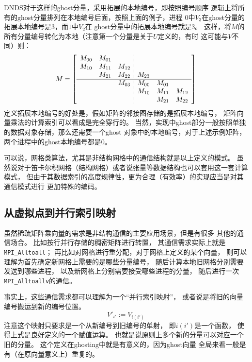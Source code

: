 \documentclass[UTF8,zihao=5]{ctexart} %
\begin{document}
DNDS对于这样的ghost分量，采用拓展的本地编号，即按照编号顺序
逻辑上将所有的ghost分量排列在本地编号后面，按照上面的例子，进程
$0$中$V_3$在ghost分量的拓展本地编号是$3$，而$1$中$V_2$在
ghost分量中的拓展本地编号就是$3$。
这样，将$M$的所有分量编号转化为本地（注意第一个分量是关于$U$定义的，有时
这可能与$V$不同）则：
$$
    M=
    \left[
        \begin{array}{ccc:ccc}
            M_{00} & M_{01} &        &        &        &        \\
            M_{10} & M_{11} & M_{12} &        &        &        \\
                   & M_{21} & M_{22} & M_{23} &        &        \\
            \hline
                   &        & M_{03} & M_{00} & M_{01} &        \\
                   &        &        & M_{10} & M_{11} & M_{12} \\
                   &        &        &        & M_{21} & M_{22} \\
        \end{array}
        \right]
$$
定义拓展本地编号的好处是，假如矩阵的邻接图存储的是拓展本地编号，
矩阵向量乘法的计算索引可以看成是完全穿行的。
当然，实现中ghost部分一般按照单独的数据对象存储，那么还需要一个ghost
对象中的本地编号，对于上述示例矩阵，两个进程中的ghost本地编号都是0。

可以说，网格类算法，尤其是非结构网格中的通信结构就是以上定义的模式。
虽然说对于笛卡尔积网格（结构网格）或者说张量等数据结构也可以套用这一套计算模式，
但由于其数据索引的高度规律性，更为合理（有效率）的实现应当是对其通信模式进行
更加特殊的编码。

\subsection{从虚拟点到并行索引映射}
\label{ssec:Ghost}
虽然稀疏矩阵乘向量的需求是非结构通信的主要应用场景，但是有很多
其他的通信场合。
比如按行并行存储的稠密矩阵进行转置，
其通信需求实际上就是\verb|MPI_Alltoall|；
再比如对网格进行重分配，对于网格上定义的某个向量，
则可以理解为首先确定新网格上需要的是哪些分量编号，
随后计算本地旧网格分别需要发送到哪些进程，
以及新网格上分别需要接受哪些进程的分量，
随后进行一次\verb|MPI_Alltoallv|的通信。

事实上，这些通信需求都可以理解为一个“并行索引映射”，
或者说是将旧的向量编号搬运到新的编号位置。
\begin{equation}
    V'_{i'} := V_{i(i')}
\end{equation}
注意这个映射只要求是一个从新编号到旧编号的单射，
即$i(i')$是一个函数，
使得上式是良好定义的一个赋值运算。
也就是说原则上多个新的分量可以对应一个旧的分量。
这个定义在ghosting中就是有意义的，因为ghost向量
全局来看一般是有（在原向量意义上）重复的。
\end{document}
